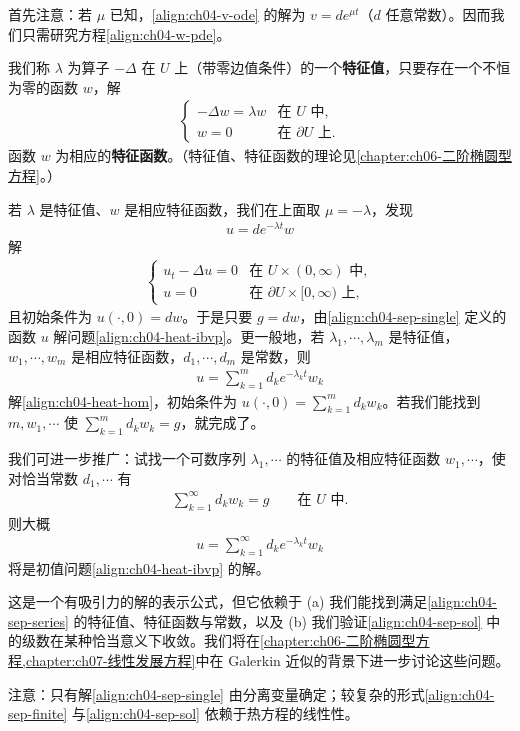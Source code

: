 \documentclass[../../main.tex]{subfiles}
\begin{document}
\begin{example}
首先注意：若 $\mu$ 已知，\eqref{align:ch04-v-ode} 的解为 $v=d e^{\mu t}$（$d$ 任意常数）。因而我们只需研究方程\eqref{align:ch04-w-pde}。

我们称 $\lambda$ 为算子 $-\Delta$ 在 $U$ 上（带零边值条件）的一个\textbf{特征值}，只要存在一个不恒为零的函数 $w$，解
\begin{align*}
\begin{cases}
-\Delta w=\lambda w & \text{在 }U\text{ 中},\\
w=0 & \text{在 }\partial U\text{ 上}.
\end{cases}
\end{align*}
函数 $w$ 为相应的\textbf{特征函数}。（特征值、特征函数的理论见\cref{chapter:ch06-二阶椭圆型方程}。）

若 $\lambda$ 是特征值、$w$ 是相应特征函数，我们在上面取 $\mu=-\lambda$，发现
\begin{align}\label{align:ch04-sep-single}
u=d e^{-\lambda t}w
\end{align}
解
\begin{align}\label{align:ch04-heat-hom}
\begin{cases}
u_t-\Delta u=0 & \text{在 }U\times(0,\infty)\text{ 中},\\
u=0 & \text{在 }\partial U\times[0,\infty)\text{ 上},
\end{cases}
\end{align}
且初始条件为 $u(\cdot,0)=dw$。于是只要 $g=dw$，由\eqref{align:ch04-sep-single} 定义的函数 $u$ 解问题\eqref{align:ch04-heat-ibvp}。更一般地，若 $\lambda_1,\cdots,\lambda_m$ 是特征值，$w_1,\cdots,w_m$ 是相应特征函数，$d_1,\cdots,d_m$ 是常数，则
\begin{align}\label{align:ch04-sep-finite}
u=\sum_{k=1}^m d_k e^{-\lambda_k t}w_k
\end{align}
解\eqref{align:ch04-heat-hom}，初始条件为 $u(\cdot,0)=\sum_{k=1}^m d_k w_k$。若我们能找到 $m,w_1,\cdots$ 使 $\sum_{k=1}^m d_k w_k=g$，就完成了。

我们可进一步推广：试找一个可数序列 $\lambda_1,\cdots$ 的特征值及相应特征函数 $w_1,\cdots$，使对恰当常数 $d_1,\cdots$ 有
\begin{align}\label{align:ch04-sep-series}
\sum_{k=1}^\infty d_k w_k=g \qquad\text{在 }U\text{ 中}.
\end{align}
则大概
\begin{align}\label{align:ch04-sep-sol}
u=\sum_{k=1}^\infty d_k e^{-\lambda_k t}w_k
\end{align}
将是初值问题\eqref{align:ch04-heat-ibvp} 的解。

这是一个有吸引力的解的表示公式，但它依赖于 (a) 我们能找到满足\eqref{align:ch04-sep-series} 的特征值、特征函数与常数，以及 (b) 我们验证\eqref{align:ch04-sep-sol} 中的级数在某种恰当意义下收敛。我们将在\cref{chapter:ch06-二阶椭圆型方程,chapter:ch07-线性发展方程}中在 Galerkin 近似的背景下进一步讨论这些问题。

注意：只有解\eqref{align:ch04-sep-single} 由分离变量确定；较复杂的形式\eqref{align:ch04-sep-finite} 与\eqref{align:ch04-sep-sol} 依赖于热方程的线性性。
\end{example}
\end{document}
